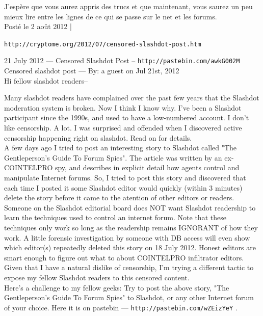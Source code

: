 \documentclass[11pt,twoside,a4paper]{article}
\begin{document}
\setlength\parindent{0pt}

J'esp{\`e}re que vous aurez appris des trucs et que maintenant, vous saurez un peu mieux lire entre les lignes de ce qui se passe sur le net et les forums.~\\

Post{\'e} le 2 ao{\^u}t 2012 |

\vfill
\clearpage

\texttt{http://cryptome.org/2012/07/censored-slashdot-post.htm}

21 July 2012 --- Censored Slashdot Post -- \texttt{http://pastebin.com/awkG002M}~\\

Censored slashdot post --- By: a guest on Jul 21st, 2012~\\

Hi fellow slashdot readers--

Many slashdot readers have complained over the past few years that the Slashdot moderation system is broken. Now I think I know why. I've been a Slashdot participant since the 1990s, and used to have a low-numbered account. I don't like censorship. A lot. I was surprised and offended when I discovered active censorship happening right on slashdot. Read on for details.~\\

A few days ago I tried to post an interesting story to Slashdot called "The Gentleperson's Guide To Forum Spies". The article was written by an ex-COINTELPRO spy, and describes in explicit detail how agents control and manipulate Internet forums. So, I tried to post this story and discovered that each time I posted it some Slashdot editor would quickly (within 3 minutes) delete the story before it came to the atention of other editors or readers. Someone on the Slashdot editorial board does NOT want Slashdot readership to learn the techniques used to control an internet forum. Note that these techniques only work so long as the readership remains IGNORANT of how they work. A little forensic investigation by someone with DB access will even show which editor(s) repeatedly deleted this story on 18 July 2012. Honest editors are smart enough to figure out what to about COINTELPRO infiltrator editors. Given that I have a natural dislike of censorship, I'm trying a different tactic to expose my fellow Slashdot readers to this censored content.~\\

Here's a challenge to my fellow geeks: Try to post the above story, "The Gentleperson's Guide To Forum Spies" to Slashdot, or any other Internet forum of your choice. Here it is on pastebin --- \texttt{http://pastebin.com/wZEizYeY} .~\\
\end{document}
